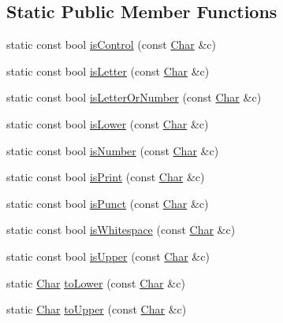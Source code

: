 \subsection*{Static Public Member Functions}
\begin{DoxyCompactItemize}
\item 
static const bool \hyperlink{classprism_1_1_char_a86d14bcdb9ae0965e6fcaef884a4582b}{is\+Control} (const \hyperlink{classprism_1_1_char}{Char} \&c)
\item 
static const bool \hyperlink{classprism_1_1_char_a72fb3d39245316423c0adb99011cc696}{is\+Letter} (const \hyperlink{classprism_1_1_char}{Char} \&c)
\item 
static const bool \hyperlink{classprism_1_1_char_a6d6454e73c529d9cf1f00477c82aa9dd}{is\+Letter\+Or\+Number} (const \hyperlink{classprism_1_1_char}{Char} \&c)
\item 
static const bool \hyperlink{classprism_1_1_char_a576cfd19fab7907d66c9cdccc3aad43b}{is\+Lower} (const \hyperlink{classprism_1_1_char}{Char} \&c)
\item 
static const bool \hyperlink{classprism_1_1_char_aea53627b06ba58775ad7c01a318885f2}{is\+Number} (const \hyperlink{classprism_1_1_char}{Char} \&c)
\item 
static const bool \hyperlink{classprism_1_1_char_a12034c9cff29ad2d6fa0686b6fa1831b}{is\+Print} (const \hyperlink{classprism_1_1_char}{Char} \&c)
\item 
static const bool \hyperlink{classprism_1_1_char_a6e6a2cd7bf083f5e119c104fa65b5022}{is\+Punct} (const \hyperlink{classprism_1_1_char}{Char} \&c)
\item 
static const bool \hyperlink{classprism_1_1_char_abb324f5ce4cd552f37b2c462893482c2}{is\+Whitespace} (const \hyperlink{classprism_1_1_char}{Char} \&c)
\item 
static const bool \hyperlink{classprism_1_1_char_a7efff77fde60bb676b332b319b018bcd}{is\+Upper} (const \hyperlink{classprism_1_1_char}{Char} \&c)
\item 
static \hyperlink{classprism_1_1_char}{Char} \hyperlink{classprism_1_1_char_a755a4a18c11c82cb6b1a504329b6cc9a}{to\+Lower} (const \hyperlink{classprism_1_1_char}{Char} \&c)
\item 
static \hyperlink{classprism_1_1_char}{Char} \hyperlink{classprism_1_1_char_a7a8a0ac241932f5fe41aed5ee015f89e}{to\+Upper} (const \hyperlink{classprism_1_1_char}{Char} \&c)
\end{DoxyCompactItemize}
